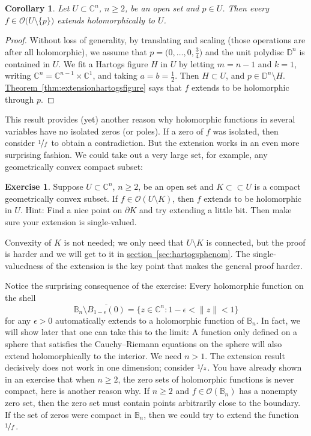 \documentclass[12pt,openany]{book}
\newcommand{\snorm}[1]{\lVert {#1} \rVert}
\newcommand{\C}{{\mathbb{C}}}
\newcommand{\D}{{\mathbb{D}}}
\newcommand{\bB}{{\mathbb{B}}}
\newcommand{\sO}{{\mathscr{O}}}
\theoremstyle{plain}
\newtheorem{cor}[thm]{Corollary}
\theoremstyle{remark}
\theoremstyle{definition}
\newenvironment{exbox}{%
    \def\FrameCommand{\vrule width 1pt \relax\hspace{10pt}}%
    \MakeFramed{\advance\hsize-\width\FrameRestore}%
}{%
    \endMakeFramed
}
\theoremstyle{exercise}
\newtheorem{exercise}{Exercise}[section]
\theoremstyle{example}
\newcommand{\sectionref}[1]{\hyperref[#1]{section~\ref*{#1}}}
\newcommand{\thmref}[1]{\hyperref[#1]{Theorem~\ref*{#1}}}
\begin{document}
\begin{cor}
Let $U \subset \C^n$, $n \geq 2$, be an open set and $p \in U$.
Then every $f \in \sO\bigl(U \setminus \{ p \} \bigr)$
extends holomorphically to $U$.
\end{cor}

\begin{proof}
Without loss of generality,
by translating and scaling (those operations are after all holomorphic),
we assume that $p = \bigl(0,\ldots,0,\frac{3}{4}\bigr)$
and the unit polydisc $\D^n$ is contained in $U$.  We fit a Hartogs figure $H$
in $U$
by letting $m=n-1$ and $k=1$, writing $\C^n = \C^{n-1} \times \C^{1}$,
and taking $a = b = \frac{1}{2}$.
Then $H \subset U$, and $p \in \D^n \setminus H$.
\thmref{thm:extensionhartogsfigure} says that
$f$ extends to be holomorphic through $p$.
\end{proof}

This result provides (yet) another reason why holomorphic functions in several
variables have no isolated zeros (or poles).  If a zero of $f$ was isolated, then
consider $\nicefrac{1}{f}$ to obtain a contradiction.
But the extension works in an even more surprising fashion.  We could
take out a very large set, for example, any geometrically
convex compact subset:

\begin{exbox}
\begin{exercise} \label{exercise:convexhartogs}
Suppose $U \subset \C^n$, $n \geq 2$, be an open set and $K \subset \subset U$
is a compact geometrically
convex subset.
If $f \in \sO(U \setminus K)$,
then $f$ extends to be holomorphic in $U$.
Hint: Find a nice point on $\partial K$ and try extending a little bit.
Then make sure your extension is single-valued.
\end{exercise}
\end{exbox}

Convexity of $K$ is not needed; we only need that $U\setminus K$
is connected, but the proof is harder and we will get to it in
\sectionref{sec:hartogsphenom}.
The single-valuedness of the extension is the key point that makes the
general proof harder.

Notice the surprising consequence of the exercise:
Every holomorphic function on the shell
\begin{equation*}
\bB_n \setminus \overline{B_{1-\epsilon}(0)} =
\bigl\{ z \in \C^n : 1-\epsilon < \snorm{z} < 1 \bigr\}
\end{equation*}
for any $\epsilon > 0$ automatically
extends to a holomorphic function of $\bB_n$.
In fact, we will show later that one can take this to the limit:
A function only defined on a sphere that satisfies the Cauchy--Riemann
equations on the sphere will also extend holomorphically to the interior.
We need $n > 1$.
The extension result decisively does not work in one dimension; consider $\nicefrac{1}{z}$.
You have already shown in an exercise that when $n \geq 2$, the zero
sets of holomorphic functions is never compact, here is another reason why.
If $n \geq 2$ and $f \in \sO(\bB_n)$ has a nonempty zero set,
then the zero set must contain points arbitrarily close to the boundary.
If the set of zeros were compact in $\bB_n$, then we could try to
extend the function $\nicefrac{1}{f}$.
\end{document}
